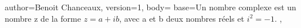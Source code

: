 {
author={Benoit Chanceaux},
version={1},
body={
base={Un nombre complexe est un nombre {{{z}}} de la forme ${{{z}}} = {{{a}}} + {{{i}}}{{{ b}}}$, avec {{{a}}} et {{{b}}} deux nombres réels et ${{{i}}}^2 = −1$.}
},
}